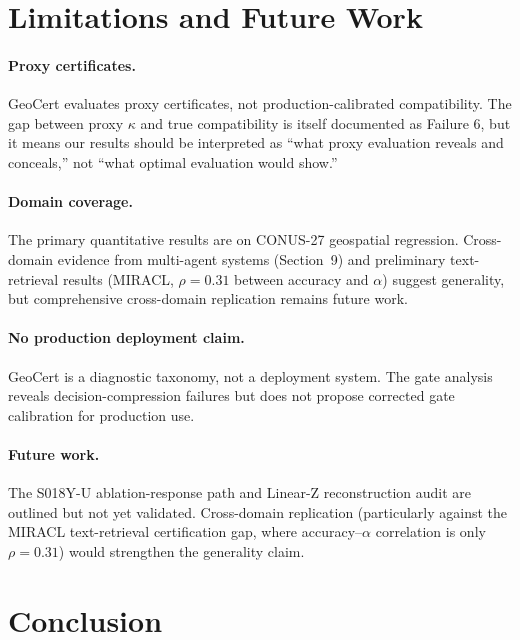 \documentclass{article}
\begin{document}
\section{Limitations and Future Work}

\paragraph{Proxy certificates.} GeoCert evaluates proxy certificates, not production-calibrated compatibility. The gap between proxy $\kappa$ and true compatibility is itself documented as Failure 6, but it means our results should be interpreted as ``what proxy evaluation reveals and conceals,'' not ``what optimal evaluation would show.''

\paragraph{Domain coverage.} The primary quantitative results are on CONUS-27 geospatial regression. Cross-domain evidence from multi-agent systems (Section~9) and preliminary text-retrieval results (MIRACL, $\rho = 0.31$ between accuracy and $\alpha$) suggest generality, but comprehensive cross-domain replication remains future work.

\paragraph{No production deployment claim.} GeoCert is a diagnostic taxonomy, not a deployment system. The gate analysis reveals decision-compression failures but does not propose corrected gate calibration for production use.

\paragraph{Future work.} The S018Y-U ablation-response path and Linear-Z reconstruction audit are outlined but not yet validated. Cross-domain replication (particularly against the MIRACL text-retrieval certification gap, where accuracy--$\alpha$ correlation is only $\rho = 0.31$) would strengthen the generality claim.

\section{Conclusion}
\end{document}
